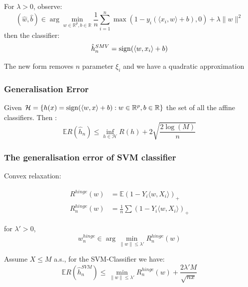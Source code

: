 \begin{theorem}
	For $\lambda > 0$, observe:
	\begin{equation*}
		(\hat{w}, \hat{b}) \in  \arg \min_{w \in \mathbb{R}^p, b \in \mathbb{R}} \frac{1}{n} \sum_{i =1}^n \max (1 - y_i(\langle x_i, w\rangle + b), 0) + \lambda \| w\|^2
	\end{equation*}
	then the classifier:
	\begin{equation}
		\hat{h}_n^{SMV} = \operatorname*{sign}(\langle w, x_i \rangle + b)
	\end{equation}
\end{theorem}
The new form removes $n$ parameter $\xi_i$ and we have a quadratic approximation


\subsubsection*{Generalisation Error}
\begin{theorem}
	Given $\mathcal{H} = \{h(x) = \operatorname*{sign}( \langle w, x \rangle + b) : w \in \mathbb{R}^p, b \in \mathbb{R} \}$ the set of all the affine classifiers. Then :
	\begin{equation*}
		\mathbb{E} R(\hat{h}_n) \leq \inf_{h \in \mathcal{H}} R(h) + 2 \sqrt{\frac{2 \log(M)}{n}}
	\end{equation*}
\end{theorem}



\subsubsection*{The generalisation error of SVM classifier}

Convex relaxation:
\begin{definition}
\begin{align*}
	R^{hinge} (w) &= \mathbb{E}  (1 - Y_i \langle w, X_i \rangle)_+\\
	R^{hinge}_n (w) &= \frac{1}{n} \sum (1 - Y_i \langle w, X_i \rangle)_+
\end{align*}
\end{definition}

\begin{method}
	for $\lambda' > 0$, 
	\begin{equation*}
		w^{hinge}_n \in \arg \min_{\|w\| \leq \lambda'} R_n^{hinge}(w)
	\end{equation*}
\end{method}

\begin{theorem}
	Assume $X \leq M$ a.s., for the SVM-Classifier we have:
	\begin{equation*}
		\mathbb{E}R(\hat{h}_n^{SVM}) \leq \min_{\|w \| \leq \lambda'} R^{hinge}_n(w) + \frac{2 \lambda' M}{\sqrt{nx}}
	\end{equation*}
\end{theorem}




